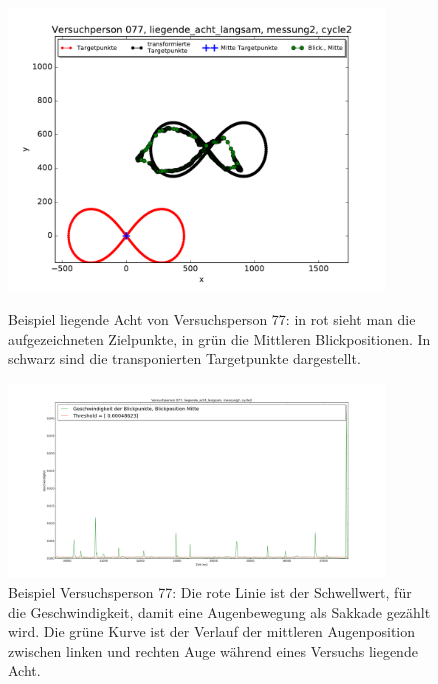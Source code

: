 \documentclass[12pt]{article}
\begin{document}
\begin{landscape}
\begin{figure}[t]
	\begin{minipage}[ht]{10cm}
	\noindent \begin{centering}	
		\includegraphics[width=10cm]{Bilder/AufzeichnungVP77.pdf}
		\par\end{centering}
	\caption{\label{fig:rohdaten}Beispiel liegende Acht von Versuchsperson 77: in rot sieht man die aufgezeichneten Zielpunkte, in gr\"un die Mittleren Blickpositionen. In schwarz sind die transponierten Targetpunkte dargestellt.}
    \end{minipage}
	\qquad
    \begin{minipage}[ht]{10cm}	
	\noindent \begin{centering}
		\includegraphics[width=10cm]{Bilder/figure_saccade_vp_77.png}
		\par\end{centering}
	\caption{\label{fig:DiagrammSakkaden}Beispiel Versuchsperson 77: Die rote Linie ist der Schwellwert, f\"ur die Geschwindigkeit, damit eine Augenbewegung als Sakkade gez\"ahlt wird. Die gr\"une Kurve ist der Verlauf der mittleren Augenposition zwischen linken und rechten Auge w\"ahrend eines Versuchs liegende Acht.}
    \end{minipage}
\end{figure}
\end{landscape}




\end{document}
